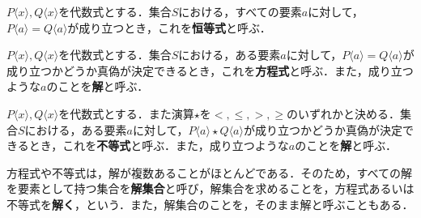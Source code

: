 \begin{definition}[恒等式]
	$P\langle x\rangle, Q\langle x\rangle$を代数式とする．集合$S$における，すべての要素$a$に対して，$P\langle a\rangle = Q\langle a\rangle$が成り立つとき，これを\textbf{恒等式}と呼ぶ．
\end{definition}
\begin{definition}[方程式]
	$P\langle x\rangle, Q\langle x\rangle$を代数式とする．集合$S$における，ある要素$a$に対して，$P\langle a\rangle = Q\langle a\rangle$が成り立つかどうか真偽が決定できるとき，これを\textbf{方程式}と呼ぶ．また，成り立つような$a$のことを\textbf{解}と呼ぶ．
\end{definition}
\begin{definition}[不等式]
	$P\langle x\rangle, Q\langle x\rangle$を代数式とする．また演算$\star$を$<, \leq, >, \geq$のいずれかと決める．集合$S$における，ある要素$a$に対して，$P\langle a\rangle \star Q\langle a\rangle$が成り立つかどうか真偽が決定できるとき，これを\textbf{不等式}と呼ぶ．また，成り立つような$a$のことを\textbf{解}と呼ぶ．
\end{definition}
\begin{rem*}
	方程式や不等式は，解が複数あることがほとんどである．そのため，すべての解を要素として持つ集合を\textbf{解集合}と呼び，解集合を求めることを，方程式あるいは不等式を\textbf{解く}，という．また，解集合のことを，そのまま解と呼ぶこともある．
\end{rem*}

